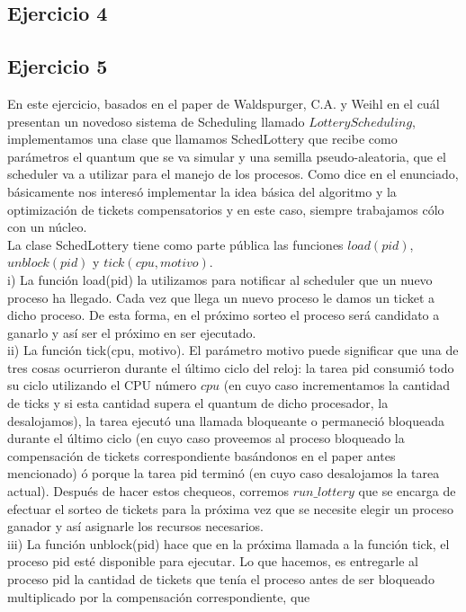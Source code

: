 \documentclass[a4paper]{article}
\begin{document}
\subsection{Ejercicio 4}
\subsection{Ejercicio 5}
En este ejercicio, basados en el paper de Waldspurger, C.A. y Weihl en el cu\'al presentan un 
novedoso sistema de Scheduling llamado $Lottery Scheduling$, implementamos una clase que llamamos
SchedLottery que recibe como par\'ametros el quantum que se va simular y una semilla 
pseudo-aleatoria, que el scheduler va a utilizar para el manejo de los procesos. Como dice en el
enunciado, b\'asicamente nos interes\'o implementar la idea b\'asica del algoritmo y la 
optimizaci\'on de tickets compensatorios y en este caso, siempre trabajamos c\'olo con un n\'ucleo. \\
La clase SchedLottery tiene como parte p\'ublica las funciones $load(pid)$, $unblock(pid)$ 
y $tick(cpu, motivo)$. \\
i) La funci\'on load(pid) la utilizamos para notificar al scheduler
que un nuevo proceso ha llegado. Cada vez que llega un nuevo proceso le damos un ticket a dicho proceso.
De esta forma, en el pr\'oximo sorteo el proceso ser\'a candidato a ganarlo y as\'i ser el pr\'oximo 
en ser ejecutado. \\
ii) La funci\'on
tick(cpu, motivo). El par\'ametro motivo puede significar que una de tres cosas
ocurrieron durante el \'ultimo ciclo del reloj: la tarea pid consumi\'o todo su
ciclo utilizando el CPU n\'umero $cpu$ (en cuyo caso incrementamos la cantidad de ticks y si esta cantidad supera el
quantum de dicho procesador, la desalojamos), la tarea ejecut\'o una llamada bloqueante o permaneci\'o 
bloqueada durante el \'ultimo ciclo (en cuyo caso proveemos al proceso bloqueado la compensaci\'on 
de tickets correspondiente bas\'andonos en el paper antes mencionado) \'o porque la tarea pid 
termin\'o (en cuyo caso desalojamos la tarea
actual). Despu\'es de hacer estos chequeos, corremos $run\_lottery$ que se encarga de efectuar el 
sorteo de tickets para la pr\'oxima vez que se necesite elegir un proceso ganador y as\'i asignarle 
los recursos necesarios. \\
iii) La funci\'on unblock(pid) hace que en la pr\'oxima llamada a la funci\'on tick, el proceso pid 
est\'e disponible para ejecutar. Lo que hacemos, es entregarle al proceso pid la cantidad de tickets
que ten\'ia el proceso antes de ser bloqueado multiplicado por la compensaci\'on correspondiente, que 
\end{document}
